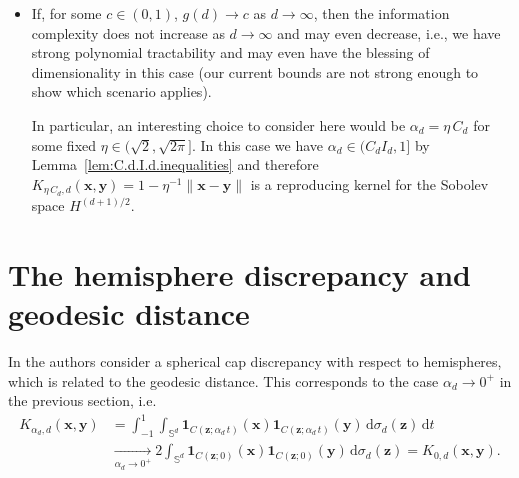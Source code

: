 \documentclass[12pt]{article}
\begin{document}
\begin{itemize}
\begin{itemize}
We recall that by choosing $\alpha_d = \sqrt{2} C_d$, we obtain 
\begin{equation}\label{eq_alphadchoice}
K_{\sqrt{2} C_d,d}(\bm{x}, \bm{y}) = 1 - \frac{1}{\sqrt{2}} \|\bm{x} - \bm{y}\|. 
\end{equation}
In this case, the constant $1/\sqrt{2}$ does not depend on the dimension, and so the kernel function $K_{\sqrt{2} C_d, d}$ does not tend to 1 as $d \to \infty$ (compare with~\eqref{kernel_bounds}). This kernel is also a reproducing kernel for the Sobolev space $H^{(d+1)/2}$ by Remark~\ref{rm_rk}.



\item If $g(d)$ decays polynomially fast to 0, say $g(d) \asymp d^{-\delta}$ as $d\to \infty$, then we do not obtain the blessing of dimensionality, but we obtain at least polynomial tractability. If $\delta >1/2$ we cannot obtain strong polynomial tractability. 
\item If $g(d)$ decays exponentially fast to 0, say $g(d) \asymp a^d$ as $d \to \infty$ for some $a \in (0,1)$, then we get the curse of dimensionality.
\end{itemize}

\item If, for some $c \in (0,1)$, $g(d) \to c$ as $d \to \infty$, then the information complexity does not increase as $d \to \infty$ and may even decrease, i.e., we have strong polynomial tractability and may even have the blessing of dimensionality in this case (our current bounds are not strong enough to show which scenario applies). 

In particular, an interesting choice to consider here would be $\alpha_d = \eta \, C_d$ for some fixed $\eta \in (\sqrt{2}, \sqrt{2\pi}]$. In this case we have $\alpha_d \in (C_d I_d, 1]$ by Lemma~\ref{lem:C.d.I.d.inequalities} and therefore $K_{\eta \, C_d, d}(\bm{x}, \bm{y}) = 1 - \eta^{-1} \|\bm{x} - \bm{y}\|$ is a reproducing kernel for the Sobolev space $H^{(d+1)/2}$.

\end{itemize}




\section{The hemisphere discrepancy and geodesic distance}\label{sec_hemisphere}

In \cite{BDM18} the authors consider a spherical cap discrepancy with respect to hemispheres, which is related to the geodesic distance. This corresponds to the case $\alpha_d \to 0^+$ in the previous section, i.e.
\begin{align*}
K_{\alpha_d, d}(\bm{x}, \bm{y}) & = \int_{-1}^1 \int_{\mathbb{S}^d} \bm{1}_{C(\bm{z}; \alpha_d \, t)}(\bm{x}) \bm{1}_{C(\bm{z}; \alpha_d \, t)}(\bm{y}) \,\mathrm{d} \sigma_d(\bm{z}) \,\mathrm{d} t \\ & \xrightarrow[\alpha_d\to0^+]{}  2 \int_{\mathbb{S}^d} \bm{1}_{C(\bm{z};0)}(\bm{x}) \bm{1}_{C(\bm{z}; 0)}(\bm{y}) \,\mathrm{d} \sigma_d(\bm{z}) = K_{0,d}(\bm{x}, \bm{y}).
\end{align*}
\end{document}
